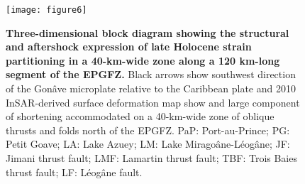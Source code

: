 \documentclass[man,natbib]{apa6}
\begin{document}
\begin{figure}
\centering
\texttt{[image: figure6]}
\caption{\textbf{Three-dimensional block diagram showing the structural and aftershock expression of late Holocene strain partitioning in a 40-km-wide zone along a 120 km-long segment of the EPGFZ.} Black arrows show southwest direction of the Gon\^ave microplate relative to the Caribbean plate and 2010 InSAR-derived surface deformation map show and large component of shortening accommodated on a 40-km-wide zone of oblique thrusts and folds north of the EPGFZ. PaP: Port-au-Prince; PG: Petit Goave; LA: Lake Azuey; LM: Lake Mirago\^ane-L\'eog\^ane; JF: Jimani thrust fault; LMF: Lamartin thrust fault; TBF: Trois Baies thrust fault; LF: L\'eog\^ane fault.}
\label{figure6}
\end{figure}
\end{document}
